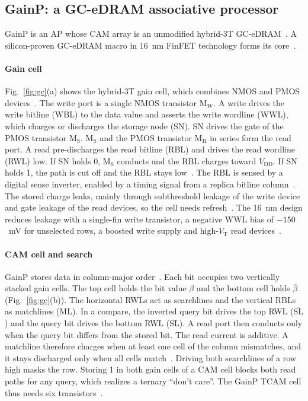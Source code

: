 \documentclass[preprint,review,12pt]{elsarticle}
\newcommand{\gainp}{GainP}
\begin{document}
\subsection{\gainp{}: a GC-eDRAM associative processor}\label{sec:gainp}
\gainp{} is an AP whose CAM array is an unmodified hybrid-3T GC-eDRAM~\cite{levi2026gainp}.
A silicon-proven GC-eDRAM macro in 16~nm FinFET technology forms its core~\cite{levi2026gainp}.

\paragraph{Gain cell}
Fig.~\ref{fig:gc}(a) shows the hybrid-3T gain cell, which combines NMOS and PMOS devices~\cite{levi2026gainp}.
The write port is a single NMOS transistor M$_\mathrm{W}$.
A write drives the write bitline (WBL) to the data value and asserts the write wordline (WWL), which charges or discharges the storage node (SN).
SN drives the gate of the PMOS transistor M$_\mathrm{S}$. M$_\mathrm{S}$ and the PMOS transistor M$_\mathrm{R}$ in series form the read port.
A read pre-discharges the read bitline (RBL) and drives the read wordline (RWL) low.
If SN holds 0, M$_\mathrm{S}$ conducts and the RBL charges toward $V_\mathrm{DD}$. If SN holds 1, the path is cut off and the RBL stays low~\cite{levi2026gainp}.
The RBL is sensed by a digital sense inverter, enabled by a timing signal from a replica bitline column~\cite{levi2026gainp}.
The stored charge leaks, mainly through subthreshold leakage of the write device and gate leakage of the read devices, so the cell needs refresh~\cite{levi2026gainp}.
The 16~nm design reduces leakage with a single-fin write transistor, a negative WWL bias of $-150$~mV for unselected rows, a boosted write supply and high-$V_\mathrm{T}$ read devices~\cite{levi2026gainp}.

\paragraph{CAM cell and search}
\gainp{} stores data in column-major order~\cite{levi2026gainp}.
Each bit occupies two vertically stacked gain cells. The top cell holds the bit value $\beta$ and the bottom cell holds $\overline{\beta}$ (Fig.~\ref{fig:gc}(b)).
The horizontal RWLs act as searchlines and the vertical RBLs as matchlines (ML).
In a compare, the inverted query bit drives the top RWL ($\overline{\mathrm{SL}}$) and the query bit drives the bottom RWL (SL).
A read port then conducts only when the query bit differs from the stored bit.
The read current is additive. A matchline therefore charges when at least one cell of the column mismatches, and it stays discharged only when all cells match~\cite{levi2026gainp}.
Driving both searchlines of a row high masks the row.
Storing 1 in both gain cells of a CAM cell blocks both read paths for any query, which realizes a ternary ``don't care''.
The \gainp{} TCAM cell thus needs six transistors~\cite{levi2026gainp}.
\end{document}
